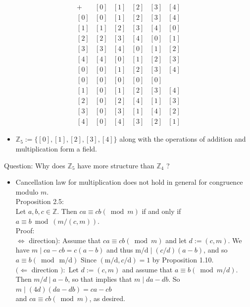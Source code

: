 \documentclass[10pt]{article}
\begin{document}
$$
\begin{array}{l|lllll}
+ & {[0]} & {[1]} & {[2]} & {[3]} & {[4]} \\
\hline[0] & {[0]} & {[1]} & {[2]} & {[3]} & {[4]} \\
{[1]} & {[1]} & {[2]} & {[3]} & {[4]} & {[0]} \\
{[2]} & {[2]} & {[3]} & {[4]} & {[0]} & {[1]} \\
{[3]} & {[3]} & {[4]} & {[0]} & {[1]} & {[2]} \\
{[4]} & {[4]} & {[0]} & {[1]} & {[2]} & {[3]} \\
{[0]} & {[0]} & {[1]} & {[2]} & {[3]} & {[4]} \\
\hline[0] & {[0]} & {[0]} & {[0]} & {[0]} \\
{[1]} & {[0]} & {[1]} & {[2]} & {[3]} & {[4]} \\
{[2]} & {[0]} & {[2]} & {[4]} & {[1]} & {[3]} \\
{[3]} & {[0]} & {[3]} & {[1]} & {[4]} & {[2]} \\
{[4]} & {[0]} & {[4]} & {[3]} & {[2]} & {[1]}
\end{array}
$$

\begin{itemize}
  \item $\mathbb{Z}_{5}:=\{[0],[1],[2],[3],[4]\}$ along with the operations of addition and multiplication form a field.
\end{itemize}

Question: Why does $\mathbb{Z}_{5}$ have more structure than $\mathbb{Z}_{4}$ ?

\begin{itemize}
  \item Cancellation law for multiplication does not hold in general for congruence modulo $m$.\\
Proposition 2.5:\\
Let $a, b, c \in \mathbb{Z}$. Then $c a \equiv c b(\bmod m)$ if and only if $a \equiv b \bmod (m /(c, m))$.\\
Proof:\\
$\Leftrightarrow$ direction): Assume that $c a \equiv c b(\bmod m)$ and let $d:=(c, m)$. We have $m \mid c a-c b=c(a-b)$ and thus $\mathrm{m} / \mathrm{d} \mid(c / d)(a-b)$, and so $a \equiv b(\bmod \mathrm{~m} / \mathrm{d})$ Since $(\mathrm{m} / \mathrm{d}, c / \mathrm{d})=1$ by Proposition 1.10.\\
$(\Leftarrow$ direction $):$ Let $d:=(c, m)$ and assume that $a \equiv b(\bmod m / d)$. Then $m / d \mid a-b$, so that implies that $m \mid d a-d b$. So $m \mid(4 d)(d a-d b)=c a-c b$\\
and $c a \equiv c b(\bmod m)$, as desired.
\end{itemize}
\end{document}
